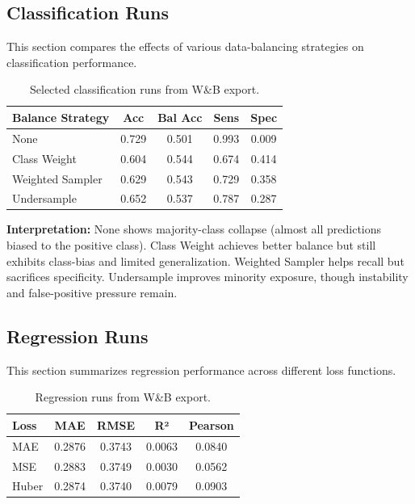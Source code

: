 \subsection{Classification Runs}
\label{subsec:classification-failure-summary}

This section compares the effects of various data-balancing strategies on classification performance.

\begin{table}[H]
\centering
\begin{tabular}{|l|c|c|c|c|}
\hline
\textbf{Balance Strategy} & \textbf{Acc} & \textbf{Bal Acc} & \textbf{Sens} & \textbf{Spec} \\
\hline
None & 0.729 & 0.501 & 0.993 & 0.009 \\
\hline
Class Weight & 0.604 & 0.544 & 0.674 & 0.414 \\
\hline
Weighted Sampler & 0.629 & 0.543 & 0.729 & 0.358 \\
\hline
Undersample & 0.652 & 0.537 & 0.787 & 0.287 \\
\hline
\end{tabular}
\caption{Selected classification runs from W\&B export.}
\label{tab:classification-failure-summary}
\end{table}

\noindent
\textbf{Interpretation:} None shows majority-class collapse (almost all predictions biased to the positive class). Class Weight achieves better balance but still exhibits class-bias and limited generalization. Weighted Sampler helps recall but sacrifices specificity. Undersample improves minority exposure, though instability and false-positive pressure remain.

\subsection{Regression Runs}
\label{subsec:regression-failure-summary}

This section summarizes regression performance across different loss functions.

\begin{table}[H]
\centering
\begin{tabular}{|l|c|c|c|c|}
\hline
\textbf{Loss} & \textbf{MAE} & \textbf{RMSE} & \textbf{R²} & \textbf{Pearson} \\
\hline
MAE & 0.2876 & 0.3743 & 0.0063 & 0.0840 \\
\hline
MSE & 0.2883 & 0.3749 & 0.0030 & 0.0562 \\
\hline
Huber & 0.2874 & 0.3740 & 0.0079 & 0.0903 \\
\hline
\end{tabular}
\caption{Regression runs from W\&B export.}
\label{tab:regression-failure-summary}
\end{table}

